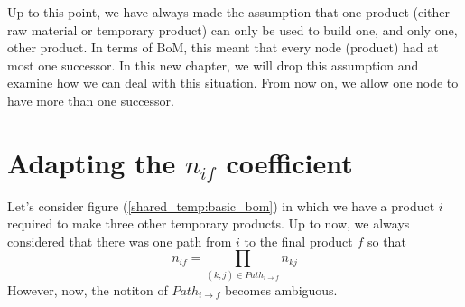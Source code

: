 Up to this point, we have always made the assumption that one product (either raw material or temporary product) can only be used to build one, and only one, other product. In terms of BoM, this meant that every node (product) had at most one successor. In this new chapter, we will drop this assumption and examine how we can deal with this situation. From now on, we allow one node to have more than one successor.

\section{Adapting the $n_{if}$ coefficient}

Let's consider figure (\ref{shared_temp:basic_bom}) in which we have a product $i$ required to make three other temporary products. Up to now, we always considered that there was one path from $i$ to the final product $f$ so that \[ n_{if} = \prod_{(k,j)\in Path_{i\rightarrow f}}n_{kj} \] However, now, the notiton of $Path_{i\rightarrow f}$ becomes ambiguous. 

